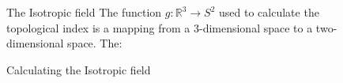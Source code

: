 \documentclass[final]{beamer}
\newlength{\sepwid}
\newlength{\onecolwid}
\newlength{\twocolwid}
\begin{document}
\begin{frame}[t]
\begin{columns}[t]
\begin{column}{\twocolwid}
\begin{columns}[t,totalwidth=\twocolwid]
\begin{column}{\onecolwid}



\end{column} %

\end{columns} %
\end{column} %

\begin{column}{\sepwid}\end{column} %

\begin{column}{\onecolwid} %


%

\begin{block}{The Isotropic field}
    The function $g:\mathbb{R}^3\rightarrow S^2$ used to calculate the topological index
    is a mapping from a 3-dimensional space to a two-dimensional space.
    The:


\end{block}


\begin{block}{Calculating the Isotropic field}


\end{block}
\end{column}
\end{columns}
\end{frame}
\end{document}
